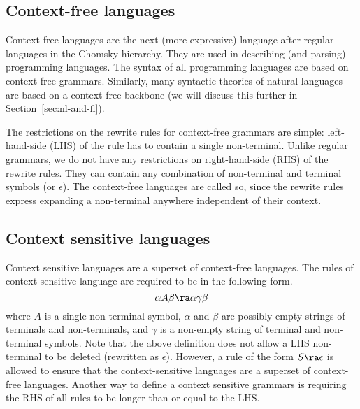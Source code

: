 
\subsection{Context-free languages}

Context-free languages are the next (more expressive) language
after regular languages in the Chomsky hierarchy.
They are used in describing (and parsing) programming languages.
The syntax of all programming languages are based on context-free grammars.%
Similarly,
many syntactic theories of natural languages are based on
a context-free backbone
(we will discuss this further in Section~\ref{sec:nl-and-fl}).

The restrictions on the rewrite rules
for context-free grammars are simple:
left-hand-side (LHS) of the rule has to contain a single non-terminal.
Unlike regular grammars,
we do not have any restrictions on right-hand-side (RHS)
of the rewrite rules.
They can contain any combination of non-terminal and terminal symbols
(or $\epsilon$).
The context-free languages are called so,
since the rewrite rules express
expanding a non-terminal anywhere independent of their context.


\subsection{Context sensitive languages}

Context sensitive languages are a superset of context-free languages.
The rules of context sensitive language are required to be in the following form.
\[
  \alpha A \beta \ra \alpha \gamma \beta
\]
where $A$ is a single non-terminal symbol,
$\alpha$ and $\beta$ are
possibly empty strings of terminals and non-terminals,
and $\gamma$ is a non-empty string of terminal and non-terminal symbols.
Note that the above definition does not allow
a LHS non-terminal to be deleted (rewritten as $\epsilon$).
However, a rule of the form $S \ra \epsilon$ is allowed
to ensure that the context-sensitive languages are
a superset of context-free languages.
Another way to define a context sensitive grammars is 
requiring the RHS of all rules to be longer than or equal to the LHS.%

